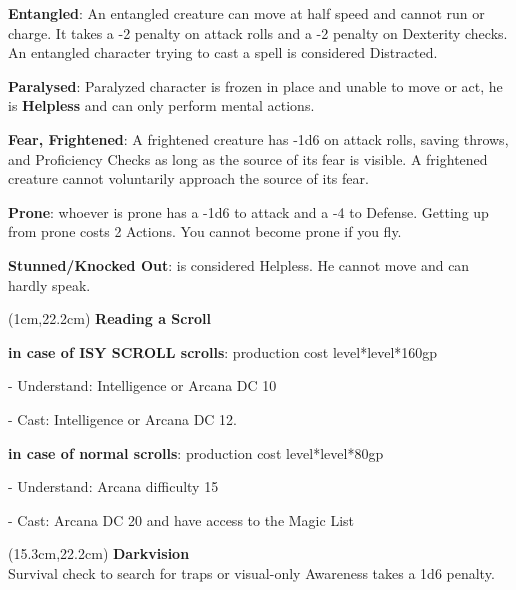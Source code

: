 \documentclass[a4paper,12 pt,openany]{book}
\begin{document}
\begin{textblock*}{19 cm}
\begin{multicols}{2}
\textbf{Entangled}: An entangled creature can move at half speed and cannot run or charge. It takes a -2 penalty on attack rolls and a -2 penalty on Dexterity checks. An entangled character trying to cast a spell is considered Distracted.

\textbf{Paralysed}:  Paralyzed character is frozen in place and unable to move or act, he is \textbf{Helpless} and can only perform mental actions.

\textbf{Fear, Frightened}: A frightened creature has -1d6 on attack rolls, saving throws, and Proficiency Checks as long as the source of its fear is visible. A frightened creature cannot voluntarily approach the source of its fear.

\textbf{Prone}: whoever is prone has a -1d6 to attack and a -4 to Defense. Getting up from prone costs 2 Actions. You cannot become prone if you fly.

\textbf{Stunned/Knocked Out}: is considered Helpless. He cannot move and can hardly speak.

\end{multicols}

\end{textblock*}


\begin{textblock*}{14cm}(1cm,22.2cm)
\textbf{Reading a Scroll}

\textbf{in case of ISY SCROLL scrolls}: production cost level*level*160gp

- Understand: Intelligence or Arcana DC 10

- Cast: Intelligence or Arcana DC 12.

\textbf{in case of normal scrolls}: production cost level*level*80gp

- Understand: Arcana difficulty 15

- Cast: Arcana DC 20 and have access to the Magic List
\end{textblock*}


\begin{textblock*}{4.7cm}(15.3cm,22.2cm)
\textbf{Darkvision}\\
Survival check to search for traps or visual-only Awareness takes a 1d6 penalty.
\end{textblock*}


~\newpage
\end{document}
